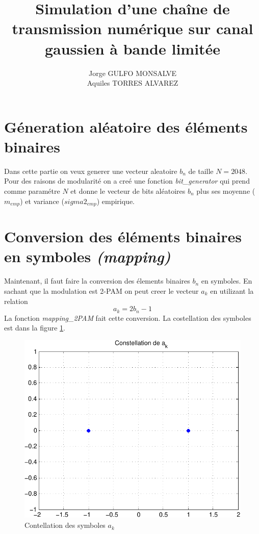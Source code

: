 \documentclass[a4paper,11pt]{article}
\title{Simulation d'une chaîne de transmission numérique sur canal gaussien à bande limitée\newline [Rapport]}
\author{Jorge GULFO MONSALVE\\Aquiles TORRES ALVAREZ}
\begin{document}
\maketitle

\section{Géneration aléatoire des éléments binaires}
Dans cette partie on veux generer une vecteur aleatoire $b_n$ de taille $N=2048$. Pour des raisons de modularité on a creé une fonction \emph{bit\_generator} qui prend comme paramétre $N$ et donne le vecteur de bits aléatoires $b_n$ plus ses moyenne ($m_{emp}$) et variance ($sigma2_{emp}$) empirique. 

\section{Conversion des éléments binaires en symboles \emph{(mapping)}}
Maintenant, il faut faire la conversion des élements binaires $b_n$ en symboles. En sachant que la modulation est 2-PAM on peut creer le vecteur $a_k$ en utilizant la relation
\[ a_k = 2b_n - 1\]
La fonction \emph{mapping\_2PAM } fait cette conversion. La costellation des symboles est dans la figure \ref{fig:sec1}.
\begin{figure}
	\begin{center}
	\includegraphics[scale=1]{contesllation_a_k-crop.pdf}
	\caption{Contellation des symboles $a_k$}
	\label{fig:sec1}
	\end{center}
\end{figure} 
\end{document}
